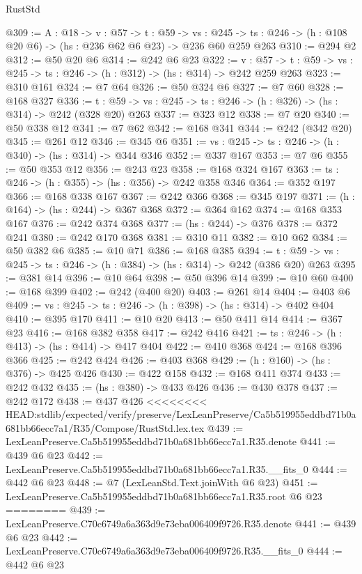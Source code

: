 \begin{lexlean}{RustStd}
\begin{coremodule}
{\begin{coremodule}
@309 := {A : @18} ->
  {v : @57} ->
  {t : @59} ->
  {vs : @245} -> {ts : @246} -> (h : @108 @20 @6) -> (hs : @236 @62 @6 @23) -> @236 @60 @259 @263
@310 := @294 @2
@312 := @50 @20 @6
@314 := @242 @6 @23
@322 := {v : @57} ->
  {t : @59} -> {vs : @245} -> {ts : @246} -> (h : @312) -> (hs : @314) -> @242 @259 @263
@323 := @310 @161
@324 := @7 @64
@326 := @50 @324 @6
@327 := @7 @60
@328 := @168 @327
@336 := {t : @59} -> {vs : @245} -> {ts : @246} -> (h : @326) -> (hs : @314) -> @242 (@328 @20) @263
@337 := @323 @12
@338 := @7 @20
@340 := @50 @338 @12
@341 := @7 @62
@342 := @168 @341
@344 := @242 (@342 @20)
@345 := @261 @12
@346 := @345 @6
@351 := {vs : @245} -> {ts : @246} -> (h : @340) -> (hs : @314) -> @344 @346
@352 := @337 @167
@353 := @7 @6
@355 := @50 @353 @12
@356 := @243 @23
@358 := @168 @324 @167
@363 := {ts : @246} -> (h : @355) -> (hs : @356) -> @242 @358 @346
@364 := @352 @197
@366 := @168 @338 @167
@367 := @242 @366
@368 := @345 @197
@371 := (h : @164) -> (hs : @244) -> @367 @368
@372 := @364 @162
@374 := @168 @353 @167
@376 := @242 @374 @368
@377 := (hs : @244) -> @376
@378 := @372 @241
@380 := @242 @170 @368
@381 := @310 @11
@382 := @10 @62
@384 := @50 @382 @6
@385 := @10 @71
@386 := @168 @385
@394 := {t : @59} -> {vs : @245} -> {ts : @246} -> (h : @384) -> (hs : @314) -> @242 (@386 @20) @263
@395 := @381 @14
@396 := @10 @64
@398 := @50 @396 @14
@399 := @10 @60
@400 := @168 @399
@402 := @242 (@400 @20)
@403 := @261 @14
@404 := @403 @6
@409 := {vs : @245} -> {ts : @246} -> (h : @398) -> (hs : @314) -> @402 @404
@410 := @395 @170
@411 := @10 @20
@413 := @50 @411 @14
@414 := @367 @23
@416 := @168 @382 @358
@417 := @242 @416
@421 := {ts : @246} -> (h : @413) -> (hs : @414) -> @417 @404
@422 := @410 @368
@424 := @168 @396 @366
@425 := @242 @424
@426 := @403 @368
@429 := (h : @160) -> (hs : @376) -> @425 @426
@430 := @422 @158
@432 := @168 @411 @374
@433 := @242 @432
@435 := (hs : @380) -> @433 @426
@436 := @430 @378
@437 := @242 @172
@438 := @437 @426
<<<<<<<< HEAD:stdlib/expected/verify/preserve/LexLeanPreserve/Ca5b519955eddbd71b0a681bb66ecc7a1/R35/Compose/RustStd.lex.tex
@439 := LexLeanPreserve.Ca5b519955eddbd71b0a681bb66ecc7a1.R35.denote
@441 := @439 @6 @23
@442 := LexLeanPreserve.Ca5b519955eddbd71b0a681bb66ecc7a1.R35.__fits_0
@444 := @442 @6 @23
@448 := @7 (LexLeanStd.Text.joinWith @6 @23)
@451 := LexLeanPreserve.Ca5b519955eddbd71b0a681bb66ecc7a1.R35.root @6 @23
========
@439 := LexLeanPreserve.C70c6749a6a363d9e73eba006409f9726.R35.denote
@441 := @439 @6 @23
@442 := LexLeanPreserve.C70c6749a6a363d9e73eba006409f9726.R35.__fits_0
@444 := @442 @6 @23

\end{coremodule}}
\end{coremodule}
\end{lexlean}
